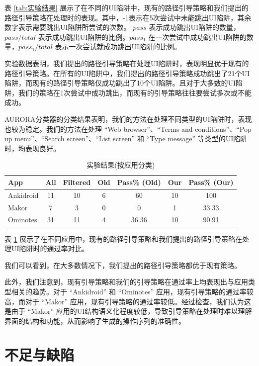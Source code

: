 \documentclass{article}
\begin{document}
表 \ref{tab:实验结果} 展示了在不同的UI陷阱中，现有的路径引导策略和我们提出的路径引导策略在处理时的表现。其中，-1表示在5次尝试中未能跳出UI陷阱，其余数字表示需要跳出UI陷阱所尝试的次数。
$pass$ 表示成功跳出UI陷阱的数量，$pass/total$ 表示成功跳出UI陷阱的比例。$pass_1$ 在一次尝试中成功跳出UI陷阱的数量，$pass_1/total$ 表示一次尝试就成功跳出UI陷阱的比例。

实验数据表明，我们提出的路径引导策略在处理UI陷阱时，表现明显优于现有的路径引导策略。在所有的UI陷阱中，我们提出的路径引导策略成功跳出了21个UI陷阱，而现有的路径引导策略仅成功跳出了10个UI陷阱。且对于大多数的UI陷阱，我们的策略在1次尝试中成功跳出，而现有的引导策略往往要尝试多次或不能成功。

AURORA分类器的分类结果表明，我们的方法在处理不同类型的UI陷阱时，表现也较为稳定。我们的方法在处理 ``Web browser''、``Terms and conditions''、``Pop up menu''、``Search screen''、``List screen'' 和 ``Type message'' 等类型的UI陷阱时，均表现良好。
\begin{table}[H]
    \centering
    \begin{tabular}{lcccccc}
    \hline
    \textbf{App} & \textbf{All} & \textbf{Filtered} & \textbf{Old} & \textbf{Pass\% (Old)} & \textbf{Our} & \textbf{Pass\% (Our)} \\
    \hline
    Ankidroid & 11 & 10 & 6 & 60 & 10 & 100 \\
    Makor & 7 & 3 & 0 & 0 & 1 & 33.33 \\
    Ominotes & 31 & 11 & 4 & 36.36 & 10 & 90.91 \\
    \hline
    \end{tabular}
    \caption{实验结果(按应用分类)}
    \label{tab:实验结果(按应用分类)}
    \end{table}

表 \ref{tab:实验结果(按应用分类)} 展示了在不同应用中，现有的路径引导策略和我们提出的路径引导策略在处理UI陷阱时的通过率对比。

我们可以看到，在大多数情况下，我们提出的路径引导策略都优于现有策略。

此外，我们注意到，现有引导策略和我们的引导策略在通过率上均表现出与应用类型相关的趋势。对于 ``Ankidroid'' 和 ``Ominotes'' 应用，现有引导策略的通过率较高，而对于 ``Makor'' 应用，现有引导策略的通过率较低。经过检查，我们认为这是由于 ``Makor'' 应用的UI结构语义化程度较低，导致引导策略在处理时难以理解界面的结构和功能，从而影响了生成的操作序列的准确性。

\section{不足与缺陷}
\end{document}
